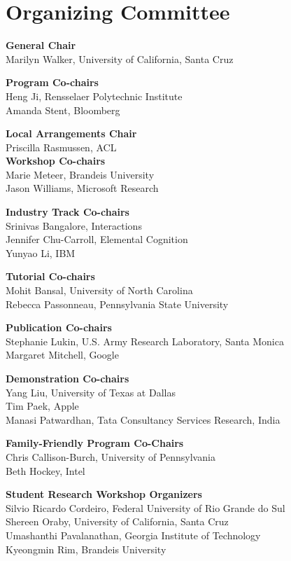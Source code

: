 \markboth{}{} %
\markright{}{} %

\section{Organizing Committee}{}\vspace{2em}

\setlength{\parindent}{0pt}

{\bf General Chair} \\
Marilyn Walker, University of California, Santa Cruz

{\bf Program Co-chairs} \\
Heng Ji, Rensselaer Polytechnic Institute\\
Amanda Stent, Bloomberg

{\bf Local Arrangements Chair} \\
Priscilla Rasmussen, ACL\\

{\bf Workshop Co-chairs} \\
Marie Meteer, Brandeis University\\
Jason Williams, Microsoft Research

{\bf Industry Track Co-chairs} \\
Srinivas Bangalore, Interactions \\
Jennifer Chu-Carroll, Elemental Cognition \\
Yunyao Li, IBM

{\bf Tutorial Co-chairs} \\
Mohit Bansal, University of North Carolina\\
Rebecca Passonneau, Pennsylvania State University

{\bf Publication Co-chairs} \\
Stephanie Lukin, U.S. Army Research Laboratory, Santa Monica\\
Margaret Mitchell, Google

{\bf Demonstration Co-chairs} \\
Yang Liu, University of Texas at Dallas\\
Tim Paek, Apple\\
Manasi Patwardhan, Tata Consultancy Services Research, India

{\bf Family-Friendly Program Co-Chairs} \\
Chris Callison-Burch, University of Pennsylvania\\
Beth Hockey, Intel

{\bf Student Research Workshop Organizers} \\
Silvio Ricardo Cordeiro, Federal University of Rio Grande do Sul \\
Shereen Oraby, University of California, Santa Cruz \\
Umashanthi Pavalanathan, Georgia Institute of Technology\\
Kyeongmin Rim, Brandeis University \\

